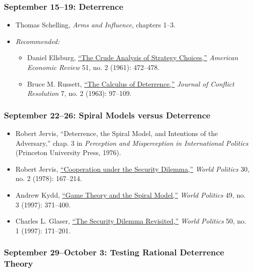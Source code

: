 \subsubsection{September 15--19:
Deterrence}\label{september-1519-deterrence}

\begin{itemize}
\item
  Thomas Schelling, \emph{Arms and Influence}, chapters 1--3.
\item
  \emph{Recommended:}

  \begin{itemize}
  \itemsep1pt\parskip0pt
  \item
    Daniel Ellsburg, \href{http://www.jstor.org/stable/1914513}{``The
    Crude Analysis of Strategy Choices,''} \emph{American Economic
    Review} 51, no. 2 (1961): 472--478.
  \item
    Bruce M. Russett, \href{http://www.jstor.org/stable/172796}{``The
    Calculus of Deterrence,''} \emph{Journal of Conflict Resolution} 7,
    no. 2 (1963): 97--109.
  \end{itemize}
\end{itemize}

\subsubsection{September 22--26: Spiral Models versus
Deterrence}\label{september-2226-spiral-models-versus-deterrence}

\begin{itemize}
\item
  Robert Jervis, ``Deterrence, the Spiral Model, and Intentions of the
  Adversary,'' chap. 3 in \emph{Perception and Misperception in
  International Politics} (Princeton University Press, 1976).
\item
  Robert Jervis,
  \href{http://www.jstor.org/stable/2009958}{``Cooperation under the
  Security Dilemma,''} \emph{World Politics} 30, no. 2 (1978): 167--214.
\item
  Andrew Kydd, \href{http://www.jstor.org/stable/25054007}{``Game Theory
  and the Spiral Model,''} \emph{World Politics} 49, no. 3 (1997):
  371--400.
\item
  Charles L. Glaser, \href{http://www.jstor.org/stable/25054031}{``The
  Security Dilemma Revisited,''} \emph{World Politics} 50, no. 1 (1997):
  171--201.
\end{itemize}

\subsubsection{September 29--October 3: Testing Rational Deterrence
Theory}\label{september-29october-3-testing-rational-deterrence-theory}

